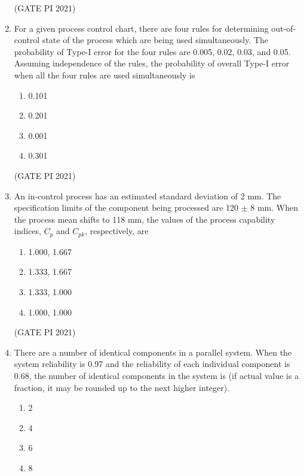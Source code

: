 \documentclass[journal,12pt,onecolumn]{IEEEtran}
\theoremstyle{remark}
\begin{document}
\begin{enumerate}
\hfill (GATE PI 2021)

\item
For a given process control chart, there are four rules for determining out-of-control state of the process which are being used simultaneously. The probability of Type-I error for the four rules are 0.005, 0.02, 0.03, and 0.05. Assuming independence of the rules, the probability of overall Type-I error when all the four rules are used simultaneously is

\begin{multicols}{4}
\begin{enumerate}
\item 0.101
\item 0.201
\item 0.001
\item 0.301
\end{enumerate}
\end{multicols}

\hfill (GATE PI 2021)

\item
An in-control process has an estimated standard deviation of 2 mm. The specification limits of the component being processed are 120 $\pm$ 8 mm. When the process mean shifts to 118 mm, the values of the process capability indices, $C_p$ and $C_{pk}$, respectively, are

\begin{multicols}{4}
\begin{enumerate}
\item 1.000, 1.667
\item 1.333, 1.667
\item 1.333, 1.000
\item 1.000, 1.000
\end{enumerate}
\end{multicols}

\hfill (GATE PI 2021)

\item
There are a number of identical components in a parallel system. When the system reliability is 0.97 and the reliability of each individual component is 0.68, the number of identical components in the system is (if actual value is a fraction, it may be rounded up to the next higher integer).

\begin{multicols}{4}
\begin{enumerate}
\item 2
\item 4
\item 6
\item 8
\end{enumerate}
\end{multicols}


\end{enumerate}
\end{document}
